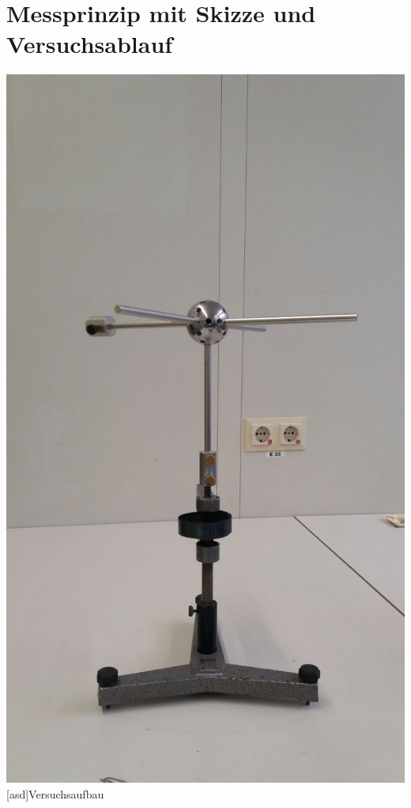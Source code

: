\documentclass[12pt,a4paper,]{scrreprt}
\begin{document}
	\chapter{Messprinzip mit Skizze und Versuchsablauf}
    \begin{center}
    \includegraphics[scale=0.2]{aufbau.jpeg}
    [asd]{Versuchsaufbau}
    \end{center}
    
\end{document}
